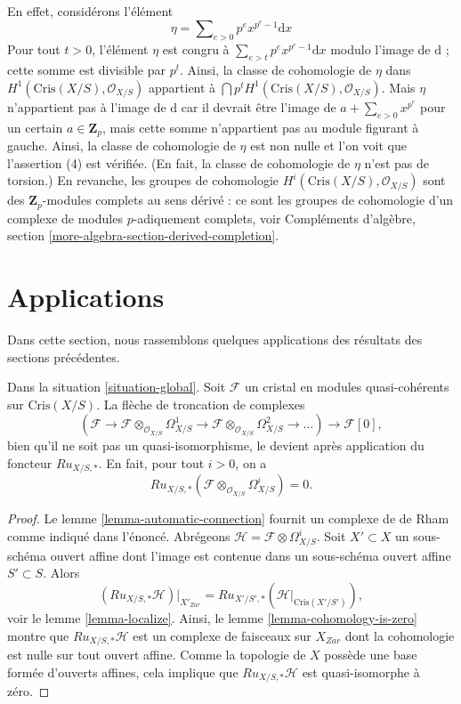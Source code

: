 \begin{example}
En effet, considérons l'élément
$$
\eta = \sum\nolimits_{e > 0} p^e x^{p^e - 1}\text{d}x
$$
Pour tout $t > 0$, l'élément $\eta$ est congru à
$\sum_{e > t} p^e x^{p^e - 1}\text{d}x$ modulo l'image de
$\text{d}$ ; cette somme est divisible par $p^t$. Ainsi, la classe de cohomologie
de $\eta$ dans $H^1(\text{Cris}(X/S), \mathcal{O}_{X/S})$
appartient à $\bigcap p^tH^1(\text{Cris}(X/S), \mathcal{O}_{X/S})$.
Mais $\eta$ n'appartient pas à l'image de $\text{d}$ car il devrait
être l'image de $a + \sum_{e > 0} x^{p^e}$ pour un certain $a \in \mathbf{Z}_p$,
mais cette somme n'appartient pas au module figurant à gauche.
Ainsi, la classe de cohomologie de $\eta$ est non nulle et l'on voit que
l'assertion (4) est vérifiée. (En fait, la classe de cohomologie de $\eta$ n'est pas de torsion.)
En revanche, les groupes de cohomologie
$H^i(\text{Cris}(X/S), \mathcal{O}_{X/S})$
sont des $\mathbf{Z}_p$-modules complets au sens dérivé : ce sont les groupes de cohomologie
d'un complexe de modules $p$-adiquement complets, voir
Compléments d'algèbre, section \ref{more-algebra-section-derived-completion}.
\end{example}








\section{Applications}
\label{section-applications}

\noindent
Dans cette section, nous rassemblons quelques applications des résultats des
sections précédentes.

\begin{proposition}
\label{proposition-compare-with-de-Rham}
Dans la situation \ref{situation-global}.
Soit $\mathcal{F}$ un cristal en modules quasi-cohérents sur
$\text{Cris}(X/S)$. La flèche de troncation de complexes
$$
(\mathcal{F} \to
\mathcal{F} \otimes_{\mathcal{O}_{X/S}} \Omega^1_{X/S} \to
\mathcal{F} \otimes_{\mathcal{O}_{X/S}} \Omega^2_{X/S} \to \ldots)
\longrightarrow \mathcal{F}[0],
$$
bien qu'il ne soit pas un quasi-isomorphisme, le devient après application du foncteur
$Ru_{X/S, *}$. En fait, pour tout $i > 0$, on a 
$$
Ru_{X/S, *}(\mathcal{F} \otimes_{\mathcal{O}_{X/S}} \Omega^i_{X/S}) = 0.
$$
\end{proposition}

\begin{proof}
Le lemme \ref{lemma-automatic-connection} fournit un complexe de de Rham
comme indiqué dans l'énoncé. Abrégeons
$\mathcal{H} = \mathcal{F} \otimes \Omega^i_{X/S}$.
Soit $X' \subset X$ un sous-schéma ouvert affine
dont l'image est contenue dans un sous-schéma ouvert affine $S' \subset S$.
Alors
$$
(Ru_{X/S, *}\mathcal{H})|_{X'_{Zar}} =
Ru_{X'/S', *}(\mathcal{H}|_{\text{Cris}(X'/S')}),
$$
voir le lemme \ref{lemma-localize}. Ainsi, le
lemme \ref{lemma-cohomology-is-zero}
montre que $Ru_{X/S, *}\mathcal{H}$ est un complexe de faisceaux sur
$X_{Zar}$ dont la cohomologie est nulle sur tout ouvert affine.
Comme la topologie de $X$ possède une base formée d'ouverts affines,
cela implique que $Ru_{X/S, *}\mathcal{H}$ est quasi-isomorphe à zéro.
\end{proof}

